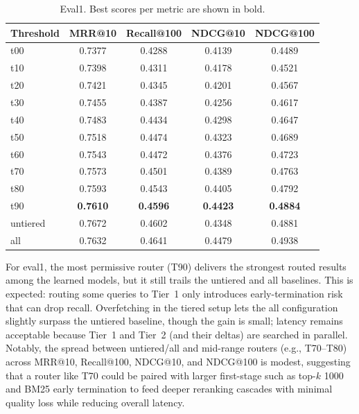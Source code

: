 \documentclass[11pt]{article}
\begin{document}
\begin{table}[H]
\centering
\small
\begin{tabular}{lcccc}
\toprule
\textbf{Threshold} & \textbf{MRR@10} & \textbf{Recall@100} & \textbf{NDCG@10} & \textbf{NDCG@100} \\
\midrule
t00 & 0.7377 & 0.4288 & 0.4139 & 0.4489 \\
t10 & 0.7398 & 0.4311 & 0.4178 & 0.4521 \\
t20 & 0.7421 & 0.4345 & 0.4201 & 0.4567 \\
t30 & 0.7455 & 0.4387 & 0.4256 & 0.4617 \\
t40 & 0.7483 & 0.4434 & 0.4298 & 0.4647 \\
t50 & 0.7518 & 0.4474 & 0.4323 & 0.4689 \\
t60 & 0.7543 & 0.4472 & 0.4376 & 0.4723 \\
t70 & 0.7573 & 0.4501 & 0.4389 & 0.4763 \\
t80 & 0.7593 & 0.4543 & 0.4405 & 0.4792 \\
t90 & \textbf{0.7610} & \textbf{0.4596} & \textbf{0.4423} & \textbf{0.4884} \\
\midrule
untiered & 0.7672 & 0.4602 & 0.4348 & 0.4881 \\
all      & 0.7632 & 0.4641 & 0.4479 & 0.4938 \\
\bottomrule
\end{tabular}
\caption{Eval1. Best scores per metric are shown in bold.}
\label{tab:eval1}
\end{table}

For eval1, the most permissive router (T90) delivers the strongest routed results among the learned models, but it still trails the untiered and all baselines. This is expected: routing some queries to Tier~1 only introduces early-termination risk that can drop recall. Overfetching in the tiered setup lets the all configuration slightly surpass the untiered baseline, though the gain is small; latency remains acceptable because Tier~1 and Tier~2 (and their deltas) are searched in parallel. Notably, the spread between untiered/all and mid-range routers (e.g., T70–T80) across MRR@10, Recall@100, NDCG@10, and NDCG@100 is modest, suggesting that a router like T70 could be paired with larger first-stage such as top-$k$ 1000 and BM25 early termination to feed deeper reranking cascades with minimal quality loss while reducing overall latency.
\end{document}
